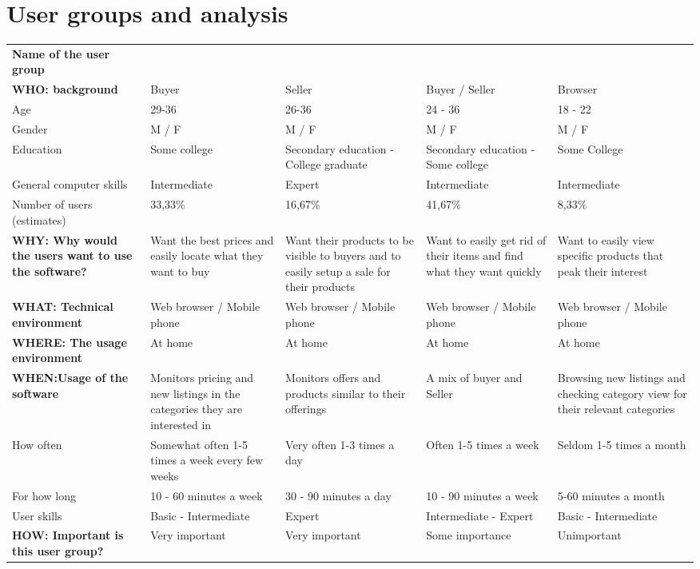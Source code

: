 \section{User groups and analysis}
\begin{tabular}{|p{2.5cm}|p{2.5cm}|p{2.5cm}|p{2.5cm}|p{2.5cm}|}
\hline
\rowcolor[HTML]{93C47D} 
\textbf{Name   of the user group} & & & & \\
\rowcolor[HTML]{D9D9D9} 
\textbf{WHO: background} & Buyer & Seller & Buyer / Seller & Browser \\ \hline
Age & 29-36 & 26-36 & 24 - 36 & 18 - 22 \\ \hline
Gender & M / F & M / F & M / F & M / F \\ \hline
Education & Some college & Secondary education - College graduate & Secondary education - Some college & Some College\\ \hline
General computer skills & Intermediate & Expert & Intermediate & Intermediate \\\hline
Number of users (estimates) & 33,33\% & 16,67\% & 41,67\% & 8,33\% \\ \hline
\rowcolor[HTML]{D9D9D9} 
\textbf{WHY: Why would the users want to use the software?} & Want the best prices and easily locate what they want to buy & Want their products to be visible to buyers and to easily setup a sale for their   products & Want to easily get rid of their items and find what they want quickly & Want to easily view specific products that peak their interest \\ \hline
\rowcolor[HTML]{D9D9D9} 
\textbf{WHAT: Technical environment} & Web browser / Mobile phone & Web browser / Mobile phone & Web   browser / Mobile phone & Web browser / Mobile phone \\ \hline
\rowcolor[HTML]{D9D9D9} 
\textbf{WHERE: The usage environment} & At home & At home & At home & At home \\ \hline
\rowcolor[HTML]{D9D9D9} 
\textbf{WHEN:Usage of the software} & Monitors pricing and new listings in the categories they are   interested in & Monitors offers and products similar to their offerings & A mix of   buyer and Seller & Browsing new listings and checking category view for their relevant categories \\ \hline
How often & Somewhat often 1-5 times a week every few weeks & Very often 1-3 times a day & Often 1-5   times a week & Seldom 1-5 times a month \\ \hline
For how long & 10 - 60 minutes a week & 30 - 90 minutes a day & 10 - 90 minutes a week & 5-60   minutes a month \\ \hline
User skills & Basic - Intermediate & Expert & Intermediate - Expert & Basic - Intermediate \\ \hline
\rowcolor[HTML]{93C47D} 
\textbf{HOW: Important is this user group?} & Very important & Very important & Some importance & Unimportant \\\hline
\end{tabular}
